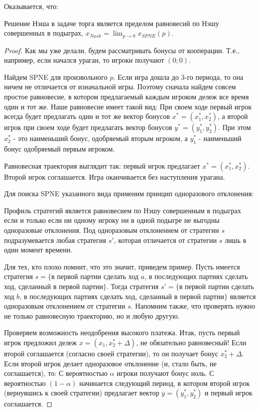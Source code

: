 Оказывается, что:

\begin{theorem} Решение Нэша в задаче торга является пределом равновесий
по Нэшу совершенных в подыграх, $x_{Nash}=\lim_{p\to0}x_{SPNE}(p)$.
\end{theorem}

\begin{proof}

Как мы уже делали, будем рассматривать бонусы от кооперации. Т.е.,
например, если начался ураган, то игроки получают $(0;0)$. 

Найдем SPNE для произвольного $p$. Если игра дошла до 3-го периода,
то она ничем не отличается от изначальной игры. Поэтому сначала найдем
совсем простое равновесие, в котором предлагаемый каждым игроком дележ
все время один и тот же. Наше равновесие имеет такой вид: При своем
ходе первый игрок всегда будет предлагать один и тот же вектор бонусов
$x^{*}=(x_{1}^{*},x_{2}^{*})$, а второй игрок при своем ходе будет
предлагать вектор бонусов $y^{*}=(y_{1}^{*},y_{2}^{*})$. При этом
$x_{2}^{*}$ - это наименьший бонус, одобряемый вторым игроком, а
$y_{1}^{*}$ - наименьший бонус одобряемый первым игроком. 

Равновесная траектория выглядит так: первый игрок предлагает $x^{*}=(x_{1}^{*},x_{2}^{*})$. Второй игрок соглашается. Игра оканчивается без наступления урагана.

Для поиска SPNE указанного вида применим принцип одноразового отклонения:

Профиль стратегий является равновесием по Нэшу совершенным в подыграх
если и только если ни одному игроку ни в одной подыгре не выгодны
одноразовые отклонения. Под одноразовым отклонением от стратегии $s$
подразумевается любая стратегия $s'$, которая отличается от стратегии
$s$ лишь в один момент времени.

Для тех, кто плохо помнит, что это значит, приведем пример.
Пусть имеется стратегия $s=\{$в первой партии сделать ход $a$, в последующих
партиях сделать ход, сделанный в первой партии$\}$. Тогда стратегия
$s'=\{$в первой партии сделать ход $b$, в последующих партиях сделать
ход, сделанный в первой партии$\}$ является одноразовым отклонением
от стратегии $s$. Напомним также, что проверять нужно не только равновесную
траекторию, но и любую другую.

Проверяем возможность неодобрения высокого платежа. Итак, пусть первый
игрок предложил дележ $x=(x_{1},x_{2}^{*}+\Delta)$, не обязательно
равновесный! Если второй соглашается (согласно своей стратегии), то
он получает бонус $x_{2}^{*}+\Delta$. Если второй игрок делает одноразовое
отклонение (и, стало быть, не соглашается), то: С вероятностью $\alpha$
игроки получают бонус ноль. С вероятностью $(1-\alpha)$ начинается
следующий период, в котором второй игрок (вернувшись к своей стратегии)
предлагает вектор $y=(y_{1}^{*},y_{2}^{*})$ и первый игрок соглашается. 


\end{proof}

